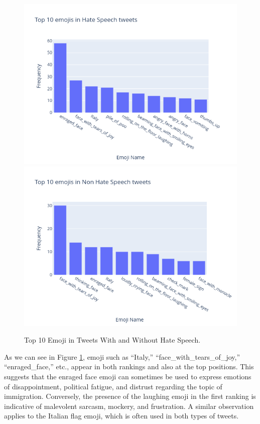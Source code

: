 \begin{figure}
    \includegraphics[width=\columnwidth]{../../results/images/emoji_top10_hs.png}
    \includegraphics[width=\columnwidth]{../../results/images/emoji_top10_nhs.png}
    \caption{Top 10 Emoji in Tweets With and Without Hate Speech.}
    \label{fig:hs_emoji}
\end{figure}
As we can see in Figure \ref{fig:hs_emoji}, emoji such as “Italy,” “face\_with\_tears\_of\_joy,” “enraged\_face,” etc., appear in both rankings and also at the top positions. This suggests that the enraged face emoji can sometimes be used to express emotions of disappointment, political fatigue, and distrust regarding the topic of immigration. Conversely, the presence of the laughing emoji in the first ranking is indicative of malevolent sarcasm, mockery, and frustration. A similar observation applies to the Italian flag emoji, which is often used in both types of tweets.
\newpage
